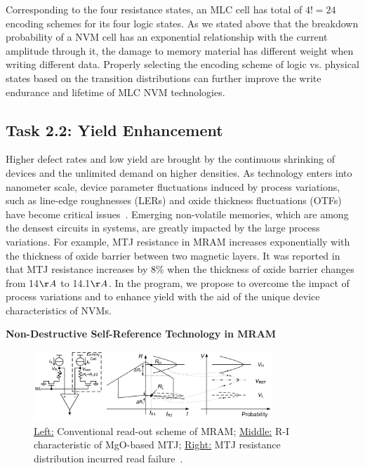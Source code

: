 Corresponding to the four resistance states, an MLC cell has total of $4! = 24$ encoding schemes for its four logic states. As we stated above that the breakdown probability of a NVM cell has an exponential relationship with the current amplitude through it, the damage to memory material has different weight when writing different data. Properly selecting the encoding scheme of logic vs. physical states based on the transition distributions can further improve the write endurance and lifetime of MLC NVM technologies.

\subsection{Task 2.2: Yield Enhancement}
Higher defect rates and low yield are brought by the continuous shrinking of devices and the unlimited demand on higher densities. As technology enters into nanometer scale, device parameter fluctuations induced by process variations, such as line-edge roughnesses (LERs) and oxide thickness fluctuations (OTFs) have become critical issues~\cite{Asenov03}. Emerging non-volatile memories, which are among the densest circuits in systems, are greatly impacted by the large process variations. For example, MTJ resistance in MRAM increases exponentially with the thickness of oxide barrier between two magnetic layers. It was reported in~\cite{Tehrani00} that MTJ resistance increases by 8\% when the thickness of oxide barrier changes from 14${\AA}$ to 14.1${\AA}$. In the program, we propose to overcome the impact of process variations and to enhance yield with the aid of the unique device characteristics of NVMs.

\squishlist \item {\textbf{Non-Destructive Self-Reference Technology in MRAM}} \squishend

\begin{figure}
\centering
\vspace{-10pt}
\includegraphics[width=0.8\textwidth]{./figure/5_selfref.pdf}
\vspace{-10pt}
\caption{\underline{Left:} Conventional read-out scheme of MRAM; \underline{Middle:} R-I characteristic of MgO-based MTJ; \underline{Right:} MTJ resistance distribution incurred read failure~\cite{Li09}.}
\label{selfref}
\vspace{-10pt}
\end{figure}


